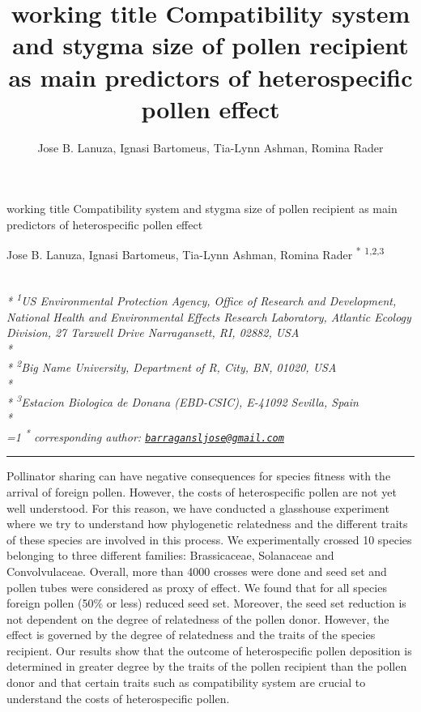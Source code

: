 \documentclass[11pt,a4paper]{article}
\title{working title Compatibility system and stygma size of pollen recipient
as main predictors of heterospecific pollen effect}
\author{
Jose B. Lanuza, Ignasi Bartomeus, Tia-Lynn Ashman, Romina Rader
}
\date{}
\begin{document}
\begin{singlespace}
\begin{center}
\huge working title Compatibility system and stygma size of pollen recipient
as main predictors of heterospecific pollen effect
\end{center}
\begin{center}
\large
Jose B. Lanuza, Ignasi Bartomeus, Tia-Lynn Ashman, Romina Rader \textsuperscript{*} \textsuperscript{1,2,3} 
\end{center}
\begin{justify}
\footnotesize \emph{ 
\\*
\textsuperscript{1}US Environmental Protection Agency, Office of Research and Development,
National Health and Environmental Effects Research Laboratory, Atlantic
Ecology Division, 27 Tarzwell Drive Narragansett, RI, 02882, USA\\*
\\*
\textsuperscript{2}Big Name University, Department of R, City, BN, 01020, USA\\*
\\*
\textsuperscript{3}Estacion Biologica de Donana (EBD-CSIC), E-41092 Sevilla, Spain\\*
}
\setcounter{num}{1}
\\[0.1cm]
\footnotesize \emph{ 
\ifnum\value{num}=1%
\textsuperscript{*} corresponding author:
\fi
\href{mailto:barragansljose@gmail.com}{\nolinkurl{barragansljose@gmail.com}}
}
\end{justify}
\normalsize

\end{singlespace}


\singlespace

\vspace{2mm}\hrule

Pollinator sharing can have negative consequences for species fitness
with the arrival of foreign pollen. However, the costs of heterospecific
pollen are not yet well understood. For this reason, we have conducted a
glasshouse experiment where we try to understand how phylogenetic
relatedness and the different traits of these species are involved in
this process. We experimentally crossed 10 species belonging to three
different families: Brassicaceae, Solanaceae and Convolvulaceae.
Overall, more than 4000 crosses were done and seed set and pollen tubes
were considered as proxy of effect. We found that for all species
foreign pollen (50\% or less) reduced seed set. Moreover, the seed set
reduction is not dependent on the degree of relatedness of the pollen
donor. However, the effect is governed by the degree of relatedness and
the traits of the species recipient. Our results show that the outcome
of heterospecific pollen deposition is determined in greater degree by
the traits of the pollen recipient than the pollen donor and that
certain traits such as compatibility system are crucial to understand
the costs of heterospecific pollen.
\end{document}
